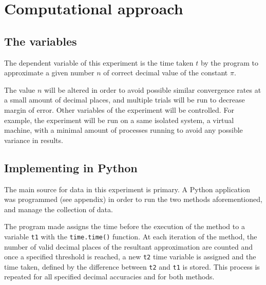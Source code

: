 \section{Computational approach}

\subsection{The variables}
The dependent variable of this experiment is the time taken $t$ by the program 
to approximate a given number $n$ of correct decimal value of the constant $\pi$.

The value $n$ will be altered in order to avoid possible similar convergence rates 
at a small amount of decimal places, and multiple trials will be run to decrease 
margin of error. Other variables of the experiment will be controlled. For example, the experiment 
will be run on a same isolated system, a virtual machine, with a minimal amount of 
processes running to avoid any possible variance in results. 


\subsection{Implementing in Python}

The main source for data in this experiment is primary. A Python application 
was programmed (see appendix) in order to run the two methods aforementioned, and manage 
the collection of data. 

The program made assigns the time before the execution of the method to a variable \verb|t1| 
with the \verb|time.time()| function. At each iteration of the method, the number of valid decimal 
places of the resultant approximation are counted and once a specified threshold is reached, 
a new \verb|t2| time variable is assigned and the time taken, defined by the difference between 
\verb|t2| and \verb|t1| is stored. This process is repeated for all specified decimal accuracies and 
for both methods.